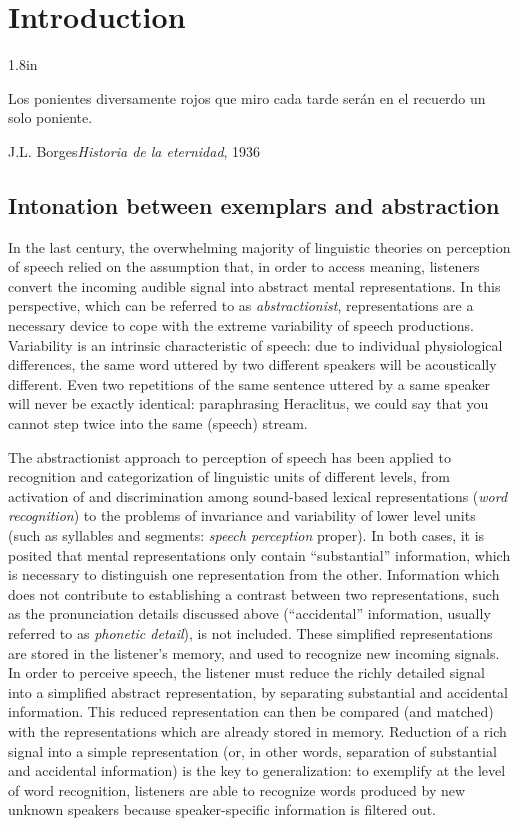\chapter{Introduction}\label{sec1}
\epigraph{1.8in}{Los ponientes diversamente rojos que miro cada tarde serán en el recuerdo un solo poniente.}{J.L. Borges}{\textit{Historia de la eternidad}, 1936}

\section{Intonation between exemplars and abstraction}\label{sec10}
In the last century, the overwhelming majority of linguistic theories on perception of speech relied on the assumption that, in order to access meaning, listeners convert the incoming audible signal into abstract mental representations. In this perspective, which can be referred to as \textit{abstractionist}, representations are a necessary device to cope with the extreme variability of speech productions. Variability is an intrinsic characteristic of speech: due to individual physiological differences, the same word uttered by two different speakers will be acoustically different. Even two repetitions of the same sentence uttered by a same speaker will never be exactly identical: paraphrasing Heraclitus, we could say that you cannot step twice into the same (speech) stream. 

The abstractionist approach to perception of speech has been applied to recognition and categorization of linguistic units of different levels, from activation of and discrimination among sound-based lexical representations (\textit{word recognition}) to the problems of invariance and variability of lower level units (such as syllables and segments: \textit{speech perception} proper). In both cases, it is posited that mental representations only contain ``substantial'' information, which is necessary to distinguish one representation from the other. Information which does not contribute to establishing a contrast between two representations, such as the pronunciation details discussed above (``accidental'' information, usually referred to as \textit{phonetic detail}), is not included. These simplified representations are stored in the listener's memory, and used to recognize new incoming signals. In order to perceive speech, the listener must reduce the richly detailed signal into a simplified abstract representation, by separating substantial and accidental information. This reduced representation can then be compared (and matched) with the representations which are already stored in memory. Reduction of a rich signal into a simple representation (or, in other words, separation of substantial and accidental information) is the key to generalization: to exemplify at the level of word recognition, listeners are able to recognize words produced by new unknown speakers because speaker-specific information is filtered out.

